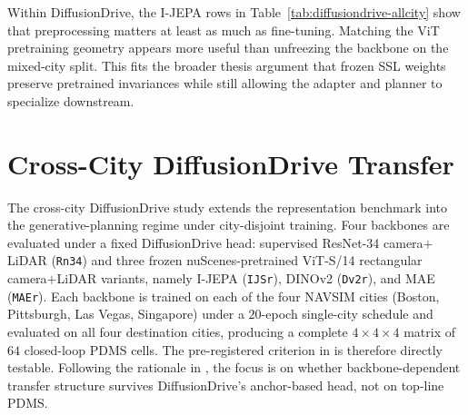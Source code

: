 Within DiffusionDrive, the I-JEPA rows in Table~\ref{tab:diffusiondrive-allcity} show that preprocessing matters at least as much as fine-tuning. Matching the ViT pretraining geometry appears more useful than unfreezing the backbone on the mixed-city split. This fits the broader thesis argument that frozen SSL weights preserve pretrained invariances while still allowing the adapter and planner to specialize downstream.

\section{Cross-City DiffusionDrive Transfer}
\label{sec:exp-phase3}

The cross-city DiffusionDrive study extends the representation benchmark into the generative-planning regime under city-disjoint training. Four backbones are evaluated under a fixed DiffusionDrive head: supervised ResNet-34 camera$+$LiDAR (\texttt{Rn34}) and three frozen nuScenes-pretrained ViT-S/14 rectangular camera$+$LiDAR variants, namely I-JEPA (\texttt{IJSr}), DINOv2 (\texttt{Dv2r}), and MAE (\texttt{MAEr}). Each backbone is trained on each of the four NAVSIM cities (Boston, Pittsburgh, Las Vegas, Singapore) under a $20$-epoch single-city schedule and evaluated on all four destination cities, producing a complete $4 \times 4 \times 4$ matrix of $64$ closed-loop PDMS cells. The pre-registered criterion in  is therefore directly testable. Following the rationale in , the focus is on whether backbone-dependent transfer structure survives DiffusionDrive's anchor-based head, not on top-line PDMS.


